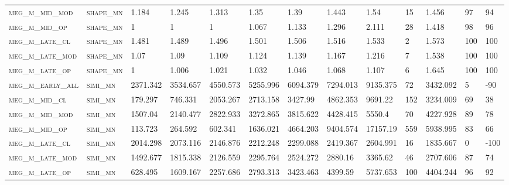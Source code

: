 \begin{landscape}
\begin{center}
\begin{footnotesize}
\begin{longtable}{lllllllllllll}
\textsc{meg\_m\_mid\_mod  } & \textsc{shape\_mn }   & 1.184    & 1.245    & 1.313    & 1.35     & 1.39     & 1.443    & 1.54     & 15     & 1.456         & 97            & 94              \\
\textsc{meg\_m\_mid\_op   } & \textsc{shape\_mn }   & 1        & 1        & 1        & 1.067    & 1.133    & 1.296    & 2.111    & 28     & 1.418         & 98            & 96              \\
\textsc{meg\_m\_late\_cl  } & \textsc{shape\_mn }   & 1.481    & 1.489    & 1.496    & 1.501    & 1.506    & 1.516    & 1.533    & 2      & 1.573         & 100           & 100             \\
\textsc{meg\_m\_late\_mod } & \textsc{shape\_mn }   & 1.07     & 1.09     & 1.109    & 1.124    & 1.139    & 1.167    & 1.216    & 7      & 1.538         & 100           & 100             \\
\textsc{meg\_m\_late\_op  } & \textsc{shape\_mn }   & 1        & 1.006    & 1.021    & 1.032    & 1.046    & 1.068    & 1.107    & 6      & 1.645         & 100           & 100             \\
\textsc{meg\_m\_early\_all} & \textsc{simi\_mn  }   & 2371.342 & 3534.657 & 4550.573 & 5255.996 & 6094.379 & 7294.013 & 9135.375 & 72     & 3432.092      & 5             & -90             \\
\textsc{meg\_m\_mid\_cl   } & \textsc{simi\_mn  }   & 179.297  & 746.331  & 2053.267 & 2713.158 & 3427.99  & 4862.353 & 9691.22  & 152    & 3234.009      & 69            & 38              \\
\textsc{meg\_m\_mid\_mod  } & \textsc{simi\_mn  }   & 1507.04  & 2140.477 & 2822.933 & 3272.865 & 3815.622 & 4428.415 & 5550.4   & 70     & 4227.928      & 89            & 78              \\
\textsc{meg\_m\_mid\_op   } & \textsc{simi\_mn  }   & 113.723  & 264.592  & 602.341  & 1636.021 & 4664.203 & 9404.574 & 17157.19 & 559    & 5938.995      & 83            & 66              \\
\textsc{meg\_m\_late\_cl  } & \textsc{simi\_mn  }   & 2014.298 & 2073.116 & 2146.876 & 2212.248 & 2299.088 & 2419.367 & 2604.991 & 16     & 1835.667      & 0             & -100            \\
\textsc{meg\_m\_late\_mod } & \textsc{simi\_mn  }   & 1492.677 & 1815.338 & 2126.559 & 2295.764 & 2524.272 & 2880.16  & 3365.62  & 46     & 2707.606      & 87            & 74              \\
\textsc{meg\_m\_late\_op  } & \textsc{simi\_mn  }   & 628.495  & 1609.167 & 2257.686 & 2793.313 & 3423.463 & 4399.59  & 5737.653 & 100    & 4404.244      & 96            & 92              \\%

\end{longtable}
\end{footnotesize}
\end{center}
\end{landscape}

